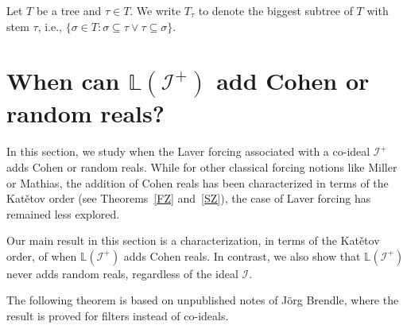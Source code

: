 \documentclass{amsart}
\theoremstyle{definition}
\theoremstyle{remark}
\numberwithin{equation}{section}
\newcommand{\li}{\mathbb{L}(\mathcal{I}^+)}
\begin{document}
Let $T$ be a tree and $\tau\in T$. We write $T_\tau$ to denote the biggest subtree of $T$ with stem $\tau$, i.e., $\{\sigma \in T: \sigma\subseteq \tau \vee \tau\subseteq \sigma \}$.


\section{When can $\li$ add Cohen or random reals?}

In this section, we study when the Laver forcing associated with a co-ideal $\mathcal{I}^+$ adds Cohen or random reals. While for other classical forcing notions like Miller or Mathias, the addition of Cohen reals has been characterized in terms of the Kat\v{e}tov order (see Theorems~\ref{FZ} and~\ref{SZ}), the case of Laver forcing has remained less explored. 

Our main result in this section is a characterization, in terms of the Kat\v{e}tov order, of when $\mathbb{L}(\mathcal{I}^+)$ adds Cohen reals. In contrast, we also show that $\mathbb{L}(\mathcal{I}^+)$ never adds random reals, regardless of the ideal $\mathcal{I}$.

The following theorem is based on unpublished notes of Jörg Brendle, where the result is proved for filters instead of co-ideals.
\end{document}
